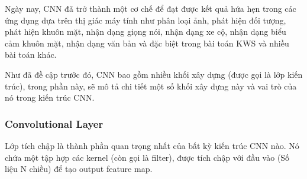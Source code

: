 Ngày nay, CNN đã trở thành một cơ chế để đạt được kết quả hứa hẹn trong các ứng dụng dựa trên thị giác máy tính như phân loại ảnh, phát hiện đối tượng, phát hiện khuôn mặt, nhận dạng giọng nói, nhận dạng xe cộ, nhận dạng biểu cảm khuôn mặt, nhận dạng văn bản và đặc biệt trong bài toán KWS và nhiều bài toán khác.

Như đã đề cập trước đó, CNN bao gồm nhiều khối xây dựng (được gọi là lớp kiến trúc), trong phần này, sẽ mô tả chi tiết một số khối xây dựng này và vai trò của nó trong kiến trúc CNN.

\subsubsection{Convolutional Layer}

Lớp tích chập là thành phần quan trọng nhất của bất kỳ kiến trúc CNN nào. Nó chứa
một tập hợp các kernel (còn gọi là filter), được tích chập với đầu vào (Số liệu N chiều) để tạo output feature map.

